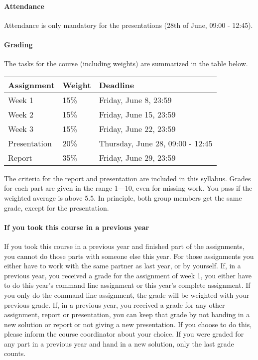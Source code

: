\documentclass[a4paper]{report}
\begin{document}
\paragraph{Attendance}
Attendance is only mandatory for the presentations (28th of June, 09:00 - 12:45).

\newpage

\paragraph{Grading}
The tasks for the course (including weights) are summarized in the table below.

\begin{table}[h!]
	\begin{tabular}{| l | l | l |}
		\hline
		\textbf{Assignment} & \textbf{Weight}	& \textbf{Deadline}					\\
		\hline
		Week 1				&	15\%			& Friday, June 8, 23:59				\\
		\hline
		Week 2				&	15\%			& Friday, June 15, 23:59			\\
		\hline
		Week 3				&	15\%			& Friday, June 22, 23:59			\\
		\hline
		Presentation		&	20\%			& Thursday, June 28, 09:00 - 12:45	\\
		\hline
		Report				&	35\%			& Friday, June 29, 23:59			\\
		\hline
	\end{tabular}
\end{table}
The criteria for the report and presentation are included in this syllabus. Grades for each part are given in the range 1—10, even for missing work. You pass if the weighted average is above 5.5. In principle, both group members get the same grade, except for the presentation.

\paragraph{If you took this course in a previous year}
If you took this course in a previous year and finished part of the assignments, you cannot do those parts with someone else this year. For those assignments you either have to work with the same partner as last year, or by yourself.
If, in a previous year, you received a grade for the assignment of week 1, you either have to do this year’s command line assignment or this year’s complete assignment. If you only do the command line assignment, the grade will be weighted with your previous grade.
If, in a previous year, you received a grade for any other assignment, report or presentation, you can keep that grade by not handing in a new solution or report or not giving a new presentation. If you choose to do this, please inform the course coordinator about your choice.
If you were graded for any part in a previous year and hand in a new solution, only the last grade counts.
\end{document}
